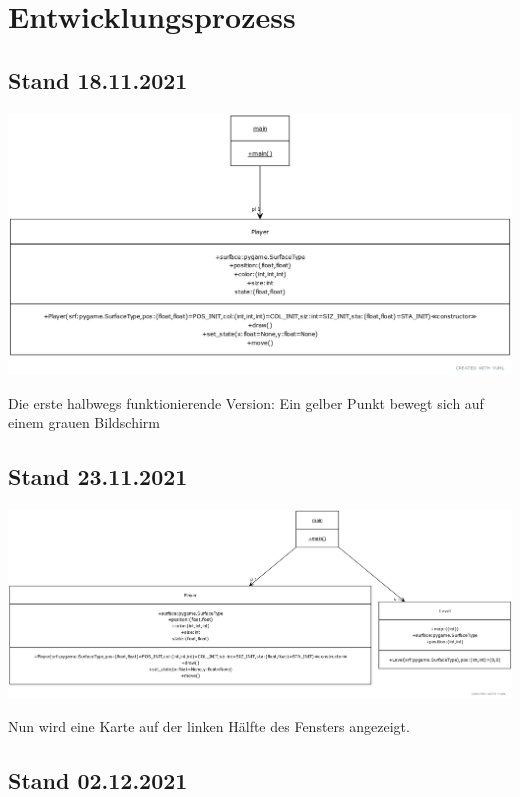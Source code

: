 \documentclass[a4paper,titlepage]{article}
\begin{document}
\newpage

\section{Entwicklungsprozess}


\subsection{Stand 18.11.2021}

\includegraphics[scale=0.34]{./img/yuml-1}

Die erste halbwegs funktionierende Version: Ein gelber Punkt bewegt sich auf einem grauen Bildschirm

\subsection{Stand 23.11.2021}

\includegraphics[scale=0.25]{./img/yuml-2}

Nun wird eine Karte auf der linken Hälfte des Fensters angezeigt.

\subsection{Stand 02.12.2021}
\end{document}
